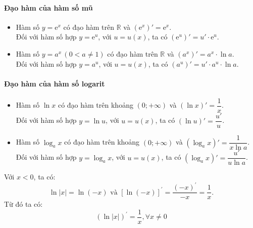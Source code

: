\paragraph{Đạo hàm của hàm số mũ}
\begin{dl}
	\begin{itemize}
	\item Hàm số $y=\mathrm{e}^x$ có đạo hàm trên $\mathbb{R}$ và $\left(\mathrm{e}^x\right)'=\mathrm{e}^x$.\\
	Đối với hàm số hợp $y=\mathrm{e}^u$, với $u=u(x)$, ta có $\left(\mathrm{e}^u\right)'=u'\cdot \mathrm{e}^u$.
	\item Hàm số $y=a^x\,\left(0<a\neq 1\right)$ có đạo hàm trên $\mathbb{R}$ và $\left(a^x\right)'=a^x\cdot \ln a$.\\
	Đối với hàm số hợp $y=a^u$, với $u=u(x)$, ta có $\left(a^u\right)'=u'\cdot a^u\cdot \ln a$.
	\end{itemize}
\end{dl}
\paragraph{Đạo hàm của hàm số logarit}
\begin{dl}
	\begin{itemize}
	\item Hàm số $\ln x$ có đạo hàm trên khoảng $\left(0;+\infty\right)$ và $\left(\ln x\right)'=\dfrac{1}{x}$.\\
	Đối với hàm số hợp $y=\ln u$, với $u=u(x)$, ta có $\left(\ln u\right)'=\dfrac{u'}{u}$.
	\item Hàm số $\log_a x$ có đạo hàm trên khoảng $\left(0;+\infty\right)$ và $\left(\log_a x\right)'=\dfrac{1}{x\ln a}$.\\
	Đối với hàm số hợp $y=\log_a x$, với $u=u(x)$, ta có $\left(\log_a x\right)'=\dfrac{u'}{u\ln a}$.
	\end{itemize}
\end{dl} 
\begin{note}
	Với $x<0$, ta có: 
	$$\ln |x|=\ln (-x) \text{ và } [\ln (-x)]^{\prime}=\dfrac{(-x)^{\prime}}{-x}=\dfrac{1}{x}.$$
	Từ đó ta có:
	$$
	(\ln |x|)^{\prime}=\dfrac{1}{x}, \forall x \neq 0
	$$
\end{note}
